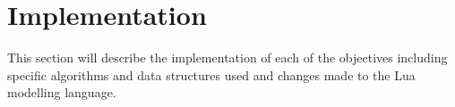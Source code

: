 \chapter{Implementation}

This section will describe the implementation of each of the objectives
including specific algorithms and data structures used and changes made to the
Lua modelling language.

